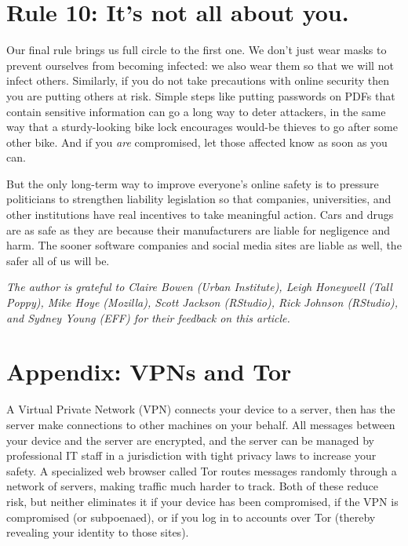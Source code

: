 \documentclass[10pt,letterpaper]{article}
\newcommand{\rulemajor}[1]{\section*{#1}}
\begin{document}
\rulemajor{Rule 10: It's not all about you.}

Our final rule brings us full circle to the first one.
We don't just wear masks to prevent ourselves from becoming infected:
we also wear them so that we will not infect others.
Similarly,
if you do not take precautions with online security then you are putting others at risk.
Simple steps like putting passwords on PDFs that contain sensitive information
can go a long way to deter attackers,
in the same way that a sturdy-looking bike lock encourages would-be thieves to go after some other bike.
And if you \emph{are} compromised,
let those affected know as soon as you can.

But the only long-term way to improve everyone's online safety
is to pressure politicians to strengthen liability legislation
so that companies, universities, and other institutions have real incentives to take meaningful action.
Cars and drugs are as safe as they are because their manufacturers are liable for negligence and harm.
The sooner software companies and social media sites are liable as well,
the safer all of us will be.

\emph{
  The author is grateful to Claire Bowen (Urban Institute),
  Leigh Honeywell (Tall Poppy),
  Mike Hoye (Mozilla),
  Scott Jackson (RStudio),
  Rick Johnson (RStudio),
  and Sydney Young (EFF)
  for their feedback on this article.
}

\nocite{*}


\section*{Appendix: VPNs and Tor}
  
A Virtual Private Network (VPN) connects your device to a server,
then has the server make connections to other machines on your behalf.
All messages between your device and the server are encrypted,
and the server can be managed by professional IT staff
in a jurisdiction with tight privacy laws
to increase your safety.
A specialized web browser called Tor routes messages randomly through a network of servers,
making traffic much harder to track.
Both of these reduce risk,
but neither eliminates it
if your device has been compromised,
if the VPN is compromised (or subpoenaed),
or if you log in to accounts over Tor
(thereby revealing your identity to those sites).
\end{document}
